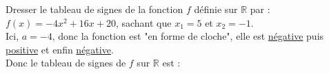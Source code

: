 \documentclass[11pt]{article}
\begin{document}
\begin{exercice}
Dresser le tableau de signes de la fonction $f$ définie sur  $\mathbb
R$ par : $f(x)=-4x^2+16x+20$, sachant que $x_1=5$ et $x_2=-1$. \\
Ici, $a=-4$, donc la fonction est "en forme de cloche", elle est
\underline{négative} puis \underline{positive} et enfin \underline{négative}. \\
Donc le tableau de signes de $f$ sur $\mathbb{R}$  est :
\begin{center}
\end{center}
\end{exercice}
\end{document}
